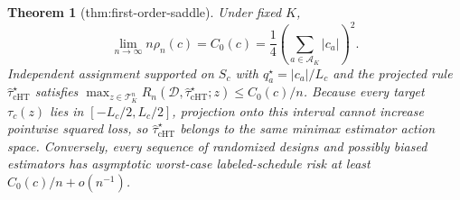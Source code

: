 \documentclass{article}
\newtheorem{theorem}{Theorem}
\begin{document}
\begin{theorem}[thm:first-order-saddle]\label{thm:first-order-saddle}
Under fixed \(K\), \[\lim_{n\to\infty}n\rho_n(c)=C_0(c)=\frac{1}{4}\left(\sum_{a\in\mathcal A_K}|c_a|\right)^2.\] Independent assignment supported on \(S_c\) with \(q_a^\star=|c_a|/L_c\) and the projected rule \(\widehat\tau_{\mathrm{cHT}}^\star\) satisfies \(\max_{z\in\mathcal T_K^n}R_n(\mathcal D,\widehat\tau_{\mathrm{cHT}}^\star;z)\le C_0(c)/n\). Because every target \(\tau_c(z)\) lies in \([-L_c/2,L_c/2]\), projection onto this interval cannot increase pointwise squared loss, so \(\widehat\tau_{\mathrm{cHT}}^\star\) belongs to the same minimax estimator action space. Conversely, every sequence of randomized designs and possibly biased estimators has asymptotic worst-case labeled-schedule risk at least \(C_0(c)/n+o(n^{-1})\).
\end{theorem}
\end{document}
